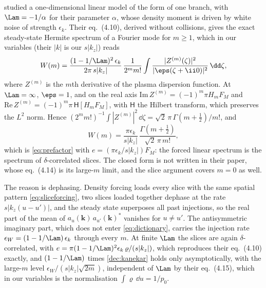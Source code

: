 \citet{Kanekar2015} studied a one-dimensional linear model of the form of one branch, with $\Lam=-1/\alpha$ for their parameter $\alpha$, whose density moment is driven by white noise of strength $\epsilon_k$. Their eq.~(4.10), derived without collisions, gives the exact steady-state Hermite spectrum of a Fourier mode for $m\ge1$, which in our variables (their $|k|$ is our $s|k_z|$) reads
\begin{equation*}
  W(m)=\frac{(1-1/\Lam)^2\,\epsilon_k}{2\pi\,s|k_z|}\,\frac{1}{2^mm!}\int\frac{|Z^{(m)}(\zeta)|^2}{|\eps(\zeta+\ii0)|^2}\,\dd\zeta ,
\end{equation*}
where $Z^{(m)}$ is the $m$th derivative of the plasma dispersion function. At $\Lam=\infty$, $\eps=1$, and on the real axis $\mathrm{Im}\,Z^{(m)}=(-1)^m\pi H_mF_M$ and $\mathrm{Re}\,Z^{(m)}=(-1)^m\pi\,\mathsf H[H_mF_M]$, with $\mathsf H$ the Hilbert transform, which preserves the $L^2$ norm. Hence $(2^mm!)^{-1}\int|Z^{(m)}|^2\,\dd\zeta=\sqrt2\,\pi\,\Gamma(m+\frac12)/m!$, and
\begin{equation}\label{dec:kanekar}
  W(m)=\frac{\pi\epsilon_k}{s|k_z|}\,\frac{\Gamma(m+\frac12)}{\sqrt2\,\pi\,m!} ,
\end{equation}
which is \eqref{eq:prefactor} with $e=(\pi\epsilon_k/s|k_z|)F_M$: the forced linear spectrum is the spectrum of $\delta$-correlated slices. The closed form is not written in their paper, whose eq.~(4.14) is its large-$m$ limit, and the slice argument covers $m=0$ as well.

The reason is dephasing. Density forcing loads every slice with the same spatial pattern \eqref{eq:sliceforcing}, two slices loaded together dephase at the rate $s|k_z(u-u')|$, and the steady state superposes all past injections, so the real part of the mean of $a_u(\boldsymbol k)\,a_{u'}(\boldsymbol k)^*$ vanishes for $u\ne u'$. The antisymmetric imaginary part, which does not enter \eqref{eq:dictionary}, carries the injection rate $\epsilon_W=(1-1/\Lam)\,\epsilon_k$ through every $m$. At finite $\Lam$ the slices are again $\delta$-correlated, with $e=\pi(1-1/\Lam)^2\epsilon_k\,\varrho/(s|k_z|)$, which reproduces their eq.~(4.10) exactly, and $(1-1/\Lam)$ times \eqref{dec:kanekar} holds only asymptotically, with the large-$m$ level $\epsilon_W/(s|k_z|\sqrt{2m})$, independent of $\Lam$ by their eq.~(4.15), which in our variables is the normalisation $\int\varrho\,\dd u=1/p_0$.

